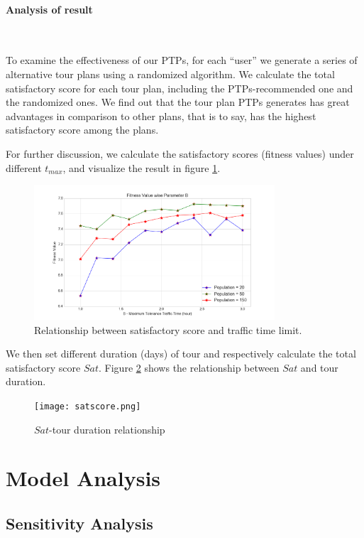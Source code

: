 \documentclass{mcmthesis}
\begin{document}
  \paragraph{Analysis of result} \
  
  To examine the effectiveness of our PTPs, for each ``user'' we generate a series of alternative tour plans using a randomized algorithm. We calculate the total satisfactory score for each tour plan, including the PTPs-recommended one and the randomized ones. We find out that the tour plan PTPs generates has great advantages in comparison to other plans, that is to say, has the highest satisfactory score among the plans. \par
  For further discussion, we calculate the satisfactory scores (fitness values) under different $t_{max}$, and visualize the result in figure \ref{fig:sstt}. \par
  \begin{figure}[h]
    \centering
    \includegraphics[width=0.8\textwidth]{popularity.png}
    \caption{Relationship between satisfactory score and traffic time limit.}
    \label{fig:sstt}
  \end{figure}
  We then set different duration (days) of tour and respectively calculate the total satisfactory score $Sat$. Figure \ref{fig:satscore} shows the relationship between $Sat$ and tour duration. \par
  \begin{figure}[h]
    \centering
    \texttt{[image: satscore.png]}
    \caption{$Sat$-tour duration relationship}
    \label{fig:satscore}
  \end{figure}



\section{Model Analysis}
\subsection{Sensitivity Analysis}
\end{document}
